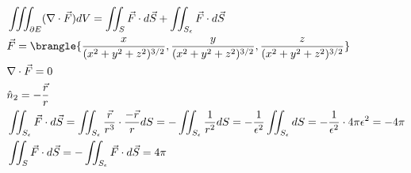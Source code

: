 \begin{align*}
    &\iiint_{\partial E}(\nabla\cdot \vec{F})dV=\iint_S\vec{F}\cdot d\vec{S}+\iint_{S_{\epsilon}}\vec{F}\cdot d\vec{S}\\
    &\vec{F}=\brangle{\frac{x}{(x^2+y^2+z^2)^{3/2}},\frac{y}{(x^2+y^2+z^2)^{3/2}},\frac{z}{(x^2+y^2+z^2)^{3/2}}}\\
    &\nabla\cdot\vec{F}=0\\
    &\hat{n}_2=-\frac{\vec{r}}{r}\\
    &\iint_{S_{\epsilon}}\vec{F}\cdot d\vec{S}=\iint_{S_{\epsilon}}\frac{\vec{r}}{r^3}\cdot\frac{-\vec{r}}{r}dS=-\iint_{S_{\epsilon}}\frac{1}{r^2}dS=-\frac{1}{\epsilon^2}\iint_{S_{\epsilon}}dS=-\frac{1}{\epsilon^2}\cdot 4\pi\epsilon^2=-4\pi\\
    &\iint_S\vec{F}\cdot d\vec{S}=-\iint_{S_{\epsilon}}\vec{F}\cdot d\vec{S}=4\pi
\end{align*}
